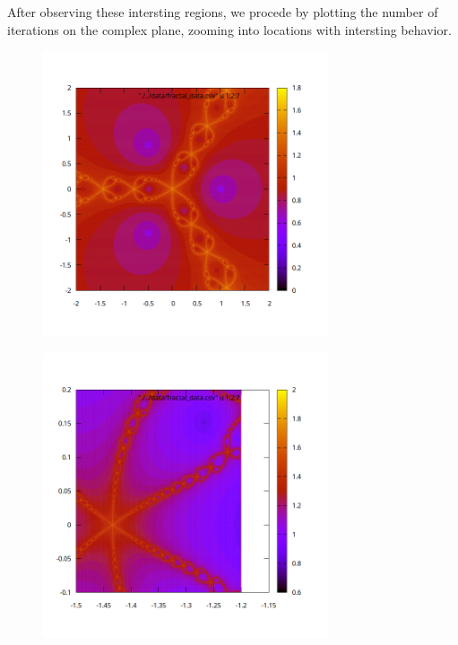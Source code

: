 \documentclass[12pt]{article}
\begin{document}
After observing these intersting regions, we procede by plotting the number of iterations on the complex plane, zooming into locations with intersting behavior. 

     \begin{figure}[ht]
    \centering
    \includegraphics[width=0.75\textwidth]{./../problem04/plots/fractal_plot-02_05_iter.png}
    \label{fig:02_05}
\end{figure}
     \begin{figure}[ht]
    \centering
    \includegraphics[width=0.75\textwidth]{./../problem04/plots/fractal_plot-02_04_iter.png}
    \label{fig:02_04}
\end{figure}
\end{document}

